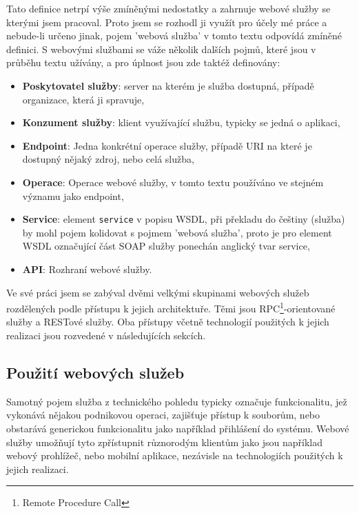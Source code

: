 \documentclass[czech,DP]{thesiskiv}
\begin{document}
Tato definice netrpí výše zmíněnými nedostatky a zahrnuje webové služby se kterými jsem pracoval. Proto jsem se rozhodl ji využít pro účely mé práce a nebude-li určeno jinak, pojem 'webová služba' v tomto textu odpovídá zmíněné definici. S webovými službami se váže několik dalších pojmů, které jsou v průběhu textu užívány, a pro úplnost jsou zde taktéž definovány:


\begin{itemize}
	\item \textbf{Poskytovatel služby}: server na kterém je služba dostupná, případě organizace, která ji spravuje,
	\item \textbf{Konzument služby}: klient využívající službu, typicky se jedná o aplikaci,
	\item \textbf{Endpoint}: Jedna konkrétní operace služby, případě URI na které je dostupný nějaký zdroj, nebo celá služba,
	\item \textbf{Operace}: Operace webové služby, v tomto textu používáno ve stejném významu jako endpoint,
	\item \textbf{Service}: element \verb|service| v popisu WSDL, při překladu do češtiny (služba) by mohl pojem kolidovat s pojmem 'webová služba', proto je pro element WSDL označující část SOAP služby ponechán anglický tvar service,
	\item \textbf{API}: Rozhraní webové služby.
\end{itemize}

Ve své práci jsem se zabýval dvěmi velkými skupinami webových služeb rozdělených podle přístupu k jejich architektuře. Těmi jsou RPC\footnote{Remote Procedure Call}-orientované služby a RESTové služby. Oba přístupy včetně technologií použitých k jejich realizaci jsou rozvedené v následujících sekcích.

\subsection{Použití webových služeb}

Samotný pojem služba z technického pohledu typicky označuje funkcionalitu, jež vykonává nějakou podnikovou operaci, zajišťuje přístup k souborům, nebo obstarává generickou funkcionalitu jako například přihlášení do systému. Webové služby umožňují tyto zpřístupnit různorodým klientům jako jsou například webový prohlížeč, nebo mobilní aplikace, nezávisle na technologiích použitých k jejich realizaci.
\end{document}
